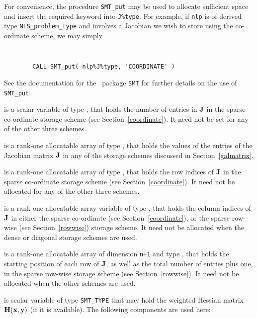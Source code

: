 \documentclass{galahad}
\newcommand{\packagename}{NLS}
\begin{document}
\begin{description}
\begin{description}
For convenience, the procedure {\tt SMT\_put}
may be used to allocate sufficient space and insert the required keyword
into {\tt J\%type}.
For example, if {\tt nlp} is of derived type {\tt \packagename\_problem\_type}
and involves a Jacobian we wish to store using the co-ordinate scheme,
we may simply
{\tt
\begin{verbatim}
        CALL SMT_put( nlp%J%type, 'COORDINATE' )
\end{verbatim}
}
\noindent
See the documentation for the \galahad\ package {\tt SMT}
for further details on the use of {\tt SMT\_put}.

 is a scalar variable of type \integer, that
holds the number of entries in ${\mathbf{J}}$
in the sparse co-ordinate storage scheme (see Section~\ref{coordinate}).
It need not be set for any of the other three schemes.

 is a rank-one allocatable array of type \realdp, that holds
the values of the entries of the Jacobian matrix ${\mathbf{J}}$ in any of the
storage schemes discussed in Section~\ref{galmatrix}.

 is a rank-one allocatable array of type \integer,
that holds the row indices of ${\mathbf{J}}$ in the sparse co-ordinate storage
scheme (see Section~\ref{coordinate}).
It need not be allocated for any of the other three schemes.

 is a rank-one allocatable array variable of type \integer,
that holds the column indices of ${\mathbf{J}}$ in either the sparse co-ordinate
(see Section~\ref{coordinate}), or the sparse row-wise
(see Section~\ref{rowwise}) storage scheme.
It need not be allocated when the dense or diagonal storage schemes are used.

 is a rank-one allocatable array of dimension {\tt n+1} and type
\integer, that holds the starting position of
each row of ${\mathbf{J}}$, as well
as the total number of entries plus one, in the sparse row-wise storage
scheme (see Section~\ref{rowwise}). It need not be allocated when the
other schemes are used.

\end{description}

 is scalar variable of type {\tt SMT\_TYPE} that may hold the
weighted Hessian matrix ${\mathbf{H}}({\mathbf{x}},{\mathbf{y}})$ (if it is available).
The following components are used here:

\begin{description}


\end{description}
\end{description}
\end{document}
